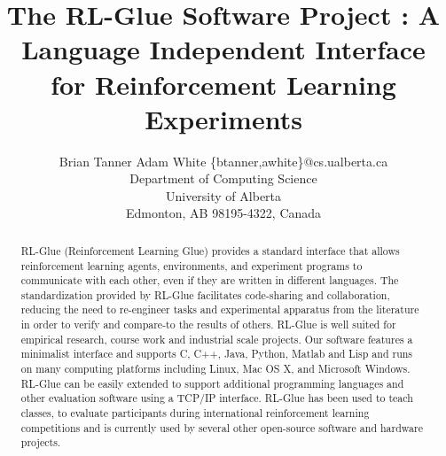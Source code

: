 \documentclass[twoside,11pt]{article}
\begin{document}
\title{The RL-Glue Software Project : A Language Independent Interface for Reinforcement Learning Experiments}




\author{\name Brian Tanner \AND Adam White  \email \{btanner,awhite\}@cs.ualberta.ca \\
       \addr Department of Computing Science\\
       University of Alberta\\
       Edmonton, AB 98195-4322, Canada}


\maketitle

\begin{abstract}%
RL-Glue (Reinforcement Learning Glue) provides a standard interface that allows reinforcement learning agents, environments, and experiment programs to communicate with each other, even if they are written in different languages. The standardization provided by RL-Glue facilitates code-sharing and collaboration, reducing the need to re-engineer tasks and experimental apparatus from the literature in order to verify and compare-to the results of others.
RL-Glue is well suited for empirical research, course work and industrial scale projects. Our software features a minimalist interface and supports C, C++, Java, Python, Matlab and Lisp and runs on many computing platforms including Linux, Mac OS X, and Microsoft Windows. RL-Glue can be easily extended to support additional programming languages and other evaluation software using a TCP/IP interface. RL-Glue has been used to teach classes, to evaluate participants during international reinforcement learning competitions and is currently used by several other open-source software and hardware projects.
\end{abstract}
\end{document}
